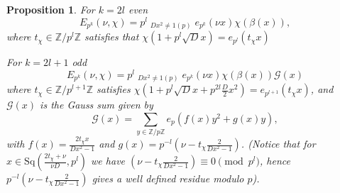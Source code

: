 \documentclass[12pt]{amsart}
\newtheorem{prop}[lem]{Proposition}
\theoremstyle{definition}
\theoremstyle{remark}
\numberwithin{equation}{section}
\newcommand{\calG}{\mathcal{G}}
\newcommand{\bbZ}{\mathbb{Z}}
\newcommand{\Sq}{\mathrm{Sq}}
\begin{document}
\begin{prop}
For $k=2l$ even
\[E_{p^k}(\nu,\chi)=p^{l}\!\!\!\!\!\!\!\!\mathop{\sum_{x\in \Sq(\frac{2t_\chi+\nu}{\nu D},p^l)}}_{Dx^2\neq 1(p)}\!\!\!\!\!\!\!\!e_{p^k}(\nu x)\chi(\beta(x)),\]
where $t_\chi\in\bbZ/p^l\bbZ$ satisfies that
$\chi(1+p^l\sqrt{D}x)=e_{p^l}(t_\chi x)$

For $k=2l+1$ odd
\[E_{p^k}(\nu,\chi)=p^{l}\!\!\!\!\!\!\!\!\mathop{\sum_{x\in \Sq(\frac{2t_\chi+\nu}{\nu D},p^l)}}_{Dx^2\neq 1(p)}\!\!\!\!\!\!\!\!e_{p^k}(\nu x)\chi(\beta(x))\calG(x)\]
where $t_\chi\in\bbZ/p^{l+1}\bbZ$ satisfies
$\chi(1+p^l\sqrt{D}x+p^{2l}\frac{D}{2}x^2)=e_{p^{l+1}}(t_\chi x)$,
and $\calG(x)$ is the Gauss sum given by
\[\calG(x)=\sum_{y\in\bbZ/p\bbZ}e_p(f(x)y^2+g(x)y),\]
with $f(x)=\frac{2t_\chi x}{Dx^2-1}$ and $g(x)=p^{-l}(\nu
-t_\chi\frac{2}{Dx^2-1})$. (Notice that for
$x\in\Sq(\frac{2t_\chi+\nu}{\nu D},p^l)$ we have $(\nu
-t_\chi\frac{2}{Dx^2-1})\equiv 0\pmod{p^l}$, hence $p^{-l}(\nu
-t_\chi\frac{2}{Dx^2-1})$ gives a well defined residue modulo $p$).
\end{prop}
\end{document}
